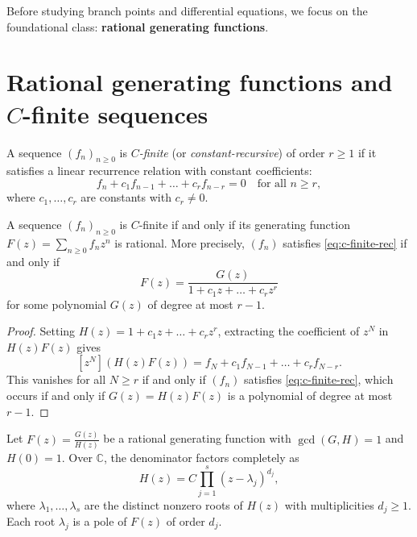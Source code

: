 Before studying branch points and differential equations, we focus on the foundational class: \textbf{rational generating functions}.

\section*{Rational generating functions and \(C\)-finite sequences}

\begin{definition}
    A sequence \((f_n)_{n \ge 0}\) is \emph{\(C\)-finite} (or \emph{constant-recursive}) of order \(r \ge 1\) if it satisfies a linear recurrence relation with constant coefficients:
    \begin{equation}
        \label{eq:c-finite-rec}
        f_n + c_1 f_{n-1} + \dots + c_r f_{n-r} = 0 \quad \text{for all } n \ge r,
    \end{equation}
    where \(c_1, \dots, c_r\) are constants with \(c_r \neq 0\).
\end{definition}

\begin{lemma}
    \label{lem:c-finite-rational}
    A sequence \((f_n)_{n \ge 0}\) is \(C\)-finite if and only if its generating function \(F(z) = \sum_{n \ge 0} f_n z^n\) is rational.
    More precisely, \((f_n)\) satisfies \eqref{eq:c-finite-rec} if and only if
    \[
        F(z) = \frac{G(z)}{1 + c_1 z + \dots + c_r z^r}
    \]
    for some polynomial \(G(z)\) of degree at most \(r-1\).
\end{lemma}

\begin{proof}
    Setting \(H(z) = 1 + c_1 z + \dots + c_r z^r\), extracting the coefficient of \(z^N\) in \(H(z) F(z)\) gives
    \[
        [z^N] \left( H(z) F(z) \right) = f_N + c_1 f_{N-1} + \dots + c_r f_{N-r}.
    \]
    This vanishes for all \(N \ge r\) if and only if \((f_n)\) satisfies \eqref{eq:c-finite-rec}, which occurs if and only if \(G(z) = H(z) F(z)\) is a polynomial of degree at most \(r-1\).
\end{proof}

Let \(F(z) = \frac{G(z)}{H(z)}\) be a rational generating function with \(\gcd(G, H) = 1\) and \(H(0) = 1\).
Over \(\mathbb{C}\), the denominator factors completely as
\[
    H(z) = C \prod_{j=1}^s (z - \lambda_j)^{d_j},
\]
where \(\lambda_1, \dots, \lambda_s\) are the distinct nonzero roots of \(H(z)\) with multiplicities \(d_j \ge 1\).
Each root \(\lambda_j\) is a pole of \(F(z)\) of order \(d_j\).

